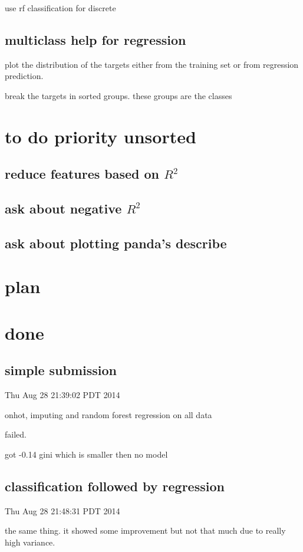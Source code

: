 \documentclass{article}
\begin{document}
use rf classification for discrete 


\subsection{multiclass help for regression}

plot the distribution of the targets either from the training set or from regression prediction.

break the targets in sorted groups. these groups are the classes

\section{to do priority unsorted}
\subsection{reduce features based on $R^2$}
\subsection{ask about negative $R^2$}
\subsection{ask about plotting panda's describe}
\section{plan}
\section{done}
\subsection{simple submission}
Thu Aug 28 21:39:02 PDT 2014

onhot, imputing and random forest regression on all data

failed.

got -0.14 gini which is smaller then no model

\subsection{classification followed by regression}
Thu Aug 28 21:48:31 PDT 2014

the same thing. it showed some improvement but not that much due to really high variance.
\end{document}
